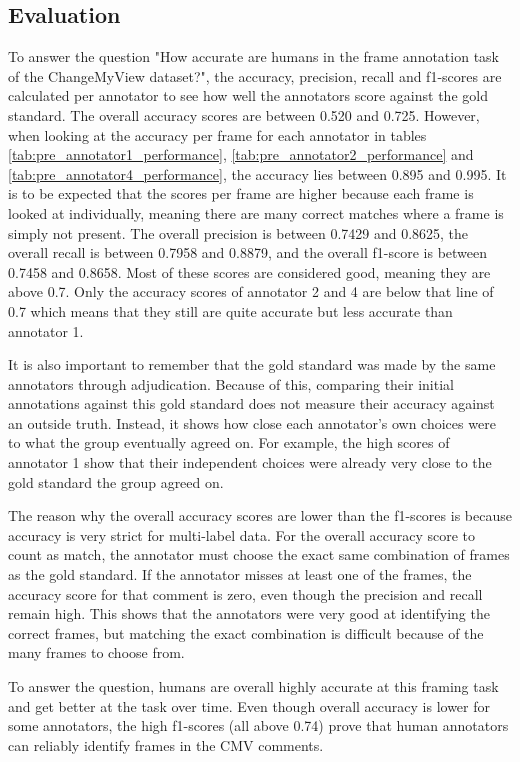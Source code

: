 \documentclass[
10pt, %
a4paper, %
oneside, %
headinclude,footinclude, %
] {book}%
\begin{document}
\subsection{Evaluation}
To answer the question "How accurate are humans in the frame annotation task of the ChangeMyView dataset?", the accuracy, precision, recall and f1-scores are calculated per annotator to see how well the annotators score against the gold standard. The overall accuracy scores are between 0.520 and 0.725. However, when looking at the accuracy per frame for each annotator in tables \ref{tab:pre_annotator1_performance}, \ref{tab:pre_annotator2_performance} and \ref{tab:pre_annotator4_performance}, the accuracy lies between 0.895 and 0.995. It is to be expected that the scores per frame are higher because each frame is looked at individually, meaning there are many correct matches where a frame is simply not present. The overall precision is between 0.7429 and 0.8625, the overall recall is between 0.7958 and 0.8879, and the overall f1-score is between 0.7458 and 0.8658. Most of these scores are considered good, meaning they are above 0.7. Only the accuracy scores of annotator 2 and 4 are below that line of 0.7 which means that they still are quite accurate but less accurate than annotator 1. 

It is also important to remember that the gold standard was made by the same annotators through adjudication. Because of this, comparing their initial annotations against this gold standard does not measure their accuracy against an outside truth. Instead, it shows how close each annotator's own choices were to what the group eventually agreed on. For example, the high scores of annotator 1 show that their independent choices were already very close to the gold standard the group agreed on.

The reason why the overall accuracy scores are lower than the f1-scores is because accuracy is very strict for multi-label data. For the overall accuracy score to count as match, the annotator must choose the exact same combination of frames as the gold standard. If the annotator misses at least one of the frames, the accuracy score for that comment is zero, even though the precision and recall remain high. This shows that the annotators were very good at identifying the correct frames, but matching the exact combination is difficult because of the many frames to choose from.

To answer the question, humans are overall highly accurate at this framing task and get better at the task over time. Even though overall accuracy is lower for some annotators, the high f1-scores (all above 0.74) prove that human annotators can reliably identify frames in the CMV comments. 
\end{document}
